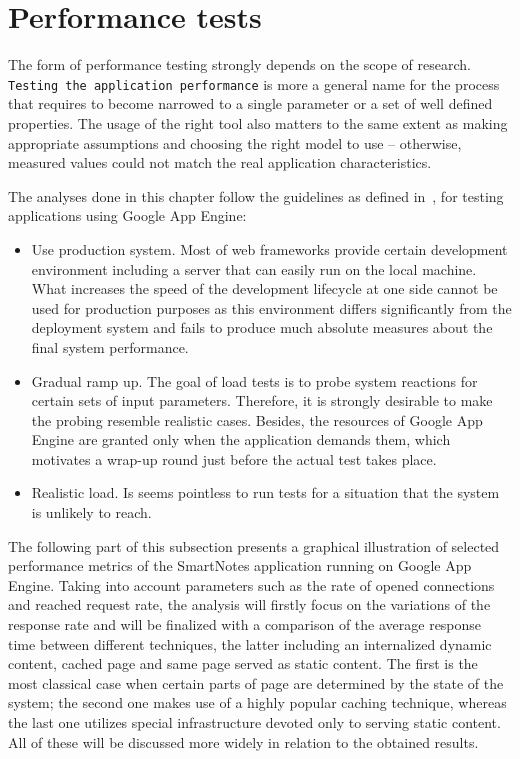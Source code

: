 \section{Performance tests}\label{sec:performance}
The form of performance testing strongly depends on the scope of research. \texttt{Testing the application performance} is more a general name for the process that requires to become narrowed to a single parameter or a set of well defined properties. The usage of the right tool also matters to the same extent as making appropriate assumptions and choosing the right model to use – otherwise, measured values could not match the real application characteristics.  
 
The analyses done in this chapter follow the guidelines as defined in~\cite{gae_best_practises_plus_load_tests}, for testing applications using Google App Engine:
\begin{itemize}
              \item{Use production system. Most of web frameworks provide certain development environment including a server that can easily run on the local machine. What increases the speed of the development lifecycle at one side cannot be used for production purposes as this environment differs significantly from the deployment system and fails to produce much absolute measures about the final system performance.}
              \item{Gradual ramp up. The goal of load tests is to probe system reactions for certain sets of input parameters. Therefore, it is strongly desirable to make the probing resemble realistic cases. Besides, the resources of Google App Engine are granted only when the application demands them, which motivates a wrap-up round just before the actual test takes place.}
              \item{Realistic load. Is seems pointless to run tests for a situation that the system is unlikely to reach.}
\end{itemize}
The following part of this subsection presents a graphical illustration of selected performance metrics of the SmartNotes application running on Google App Engine. Taking into account parameters such as the rate of opened connections and reached request rate, the analysis will firstly focus on the variations of the response rate and will be finalized with a comparison of the average response time between different techniques, the latter including an internalized dynamic content, cached page and same page served as static content. The first is the most classical case when certain parts of page are determined by the state of the system; the second one makes use of a highly popular caching technique, whereas the last one utilizes special infrastructure devoted only to serving static content. All of these will be discussed more widely in relation to the obtained results.
 
